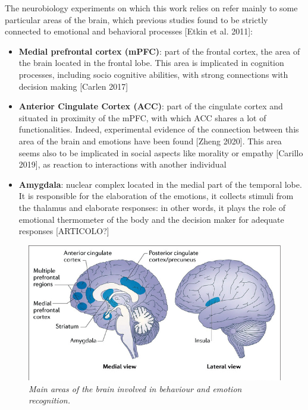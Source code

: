 \documentclass[12pt, a4paper]{article}
\begin{document}
	
	The neurobiology experiments on which this work relies on refer mainly to some particular areas of the brain, which previous studies found to be strictly connected to emotional and behavioral processes [Etkin et al. 2011]:
	\begin{itemize}
		
		\item \textbf{Medial prefrontal cortex (mPFC)}:  part of the frontal cortex, the area of the brain located in the frontal lobe. This area is implicated in cognition processes, including socio cognitive abilities,  with strong connections with decision making [Carlen 2017]
		
		\item \textbf{Anterior Cingulate Cortex (ACC)}: part of the cingulate cortex and situated in proximity of the mPFC,  with which  ACC shares a lot of functionalities. Indeed, experimental evidence of the connection between this area of the brain and emotions have been found [Zheng 2020]. This area seems also to be implicated in social aspects like morality or empathy [Carillo 2019], as reaction to interactions with another individual
		
		\item \textbf{Amygdala}: nuclear complex located in the medial part of the temporal lobe. It is responsible for the elaboration of the emotions, it collects stimuli from the thalamus and elaborate responses: in other words, it plays the role of emotional thermometer of the body and the decision maker for adequate responses [ARTICOLO?]
	\end{itemize}


	
	\begin{figure}[H]
		\begin{center}
			\includegraphics[scale=.55]{brain.png} 
		\end{center} 
		\caption{\textit{Main areas of the brain involved in behaviour and emotion recognition.}}
		
	\end{figure}
\end{document}
